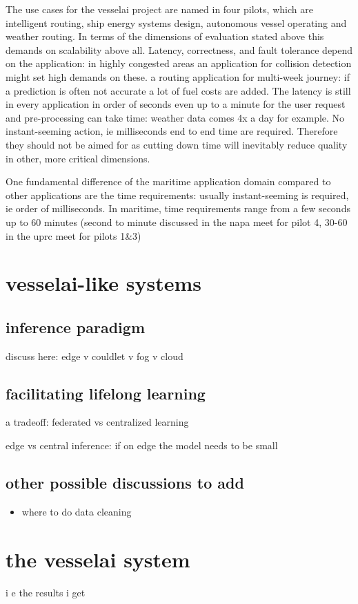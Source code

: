 The use cases for the vesselai project are named in four pilots, which are intelligent routing, ship energy systems design, autonomous vessel operating and weather routing. In terms of the dimensions of evaluation stated above this demands on scalability above all. Latency, correctness, and fault tolerance depend on the application: in highly congested areas an application for collision detection might set high demands on these. a routing application for multi-week journey: if a prediction is often not accurate a lot of fuel costs are added. The latency is still in every application in order of seconds even up to a minute for the user request and pre-processing can take time: weather data comes 4x a day for example. No instant-seeming action, ie milliseconds end to end time are required. Therefore they should not be aimed for as cutting down time will inevitably reduce quality in other, more critical dimensions.

One fundamental difference of the maritime application domain compared to other applications are the time requirements: usually instant-seeming is required, ie order of milliseconds. In maritime, time requirements range from a few seconds up to 60 minutes (second to minute discussed in the napa meet for pilot 4, 30-60 in the uprc meet for pilots 1&3)

\chapter{vesselai-like systems}

\section{inference paradigm}

discuss here: edge v couldlet v fog v cloud


\section{facilitating lifelong learning}

a tradeoff: federated vs centralized learning \cite{iotsurvey}

edge vs central inference: if on edge the model needs to be small \cite{iotsurvey}

\section{other possible discussions to add}

\begin{itemize}
    \item where to do data cleaning
\end{itemize}

\chapter{the vesselai system}

i e the results i get
